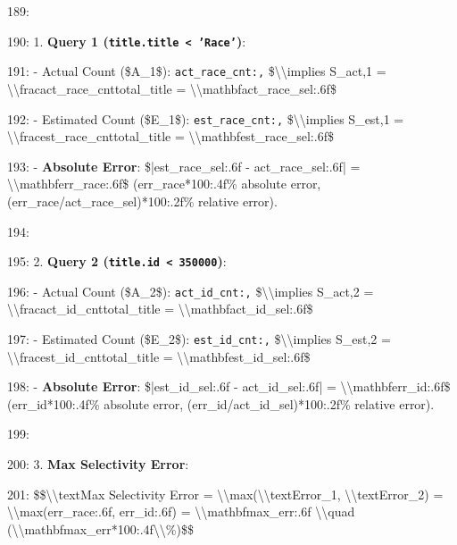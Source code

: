 \documentclass[11pt,a4paper]{article}
\begin{document}
189:

190: 1. \textbf{Query 1 (\texttt{title.title < 'Race'})}:

191:    - Actual Count (\$A\_1\$): \texttt{{act\_race\_cnt:,}} \$\textbackslash{}\textbackslash{}implies S\_{{act,1}} = \textbackslash{}\textbackslash{}frac{{{act\_race\_cnt}}}{{{total\_title}}} = \textbackslash{}\textbackslash{}mathbf{{{act\_race\_sel:.6f}}}\$

192:    - Estimated Count (\$E\_1\$): \texttt{{est\_race\_cnt:,}} \$\textbackslash{}\textbackslash{}implies S\_{{est,1}} = \textbackslash{}\textbackslash{}frac{{{est\_race\_cnt}}}{{{total\_title}}} = \textbackslash{}\textbackslash{}mathbf{{{est\_race\_sel:.6f}}}\$

193:    - \textbf{Absolute Error}: \$|{est\_race\_sel:.6f} - {act\_race\_sel:.6f}| = \textbackslash{}\textbackslash{}mathbf{{{err\_race:.6f}}}\$ ({err\_race*100:.4f}\% absolute error, {(err\_race/act\_race\_sel)*100:.2f}\% relative error).

194:

195: 2. \textbf{Query 2 (\texttt{title.id < 350000})}:

196:    - Actual Count (\$A\_2\$): \texttt{{act\_id\_cnt:,}} \$\textbackslash{}\textbackslash{}implies S\_{{act,2}} = \textbackslash{}\textbackslash{}frac{{{act\_id\_cnt}}}{{{total\_title}}} = \textbackslash{}\textbackslash{}mathbf{{{act\_id\_sel:.6f}}}\$

197:    - Estimated Count (\$E\_2\$): \texttt{{est\_id\_cnt:,}} \$\textbackslash{}\textbackslash{}implies S\_{{est,2}} = \textbackslash{}\textbackslash{}frac{{{est\_id\_cnt}}}{{{total\_title}}} = \textbackslash{}\textbackslash{}mathbf{{{est\_id\_sel:.6f}}}\$

198:    - \textbf{Absolute Error}: \$|{est\_id\_sel:.6f} - {act\_id\_sel:.6f}| = \textbackslash{}\textbackslash{}mathbf{{{err\_id:.6f}}}\$ ({err\_id*100:.4f}\% absolute error, {(err\_id/act\_id\_sel)*100:.2f}\% relative error).

199:

200: 3. \textbf{Max Selectivity Error}:

201:    \$\$\textbackslash{}\textbackslash{}text{{Max Selectivity Error}} = \textbackslash{}\textbackslash{}max(\textbackslash{}\textbackslash{}text{{Error}}\_1, \textbackslash{}\textbackslash{}text{{Error}}\_2) = \textbackslash{}\textbackslash{}max({err\_race:.6f}, {err\_id:.6f}) = \textbackslash{}\textbackslash{}mathbf{{{max\_err:.6f}}} \textbackslash{}\textbackslash{}quad (\textbackslash{}\textbackslash{}mathbf{{{max\_err*100:.4f}\textbackslash{}\textbackslash{}\%}})\$\$
\end{document}
